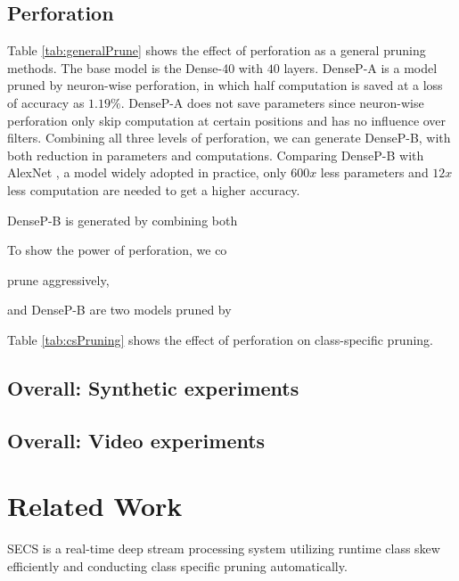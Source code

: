 \documentclass[pageno]{jpaper}
\begin{document}
\subsection{Perforation}
Table \ref{tab:generalPrune} shows the effect of perforation as a general pruning methods. The base model is the Dense-40 \cite{huang2017densely} with $40$ layers. DenseP-A is a model pruned by neuron-wise perforation, in which half computation is saved at a loss of accuracy as $1.19\%$. DenseP-A does not save parameters since neuron-wise perforation only skip computation at certain positions and has no influence over filters. Combining all three levels of perforation, we can generate DenseP-B, with both reduction in parameters and computations. Comparing DenseP-B with AlexNet \cite{NIPS2012_4824}, a model widely adopted in practice, only $600x$ less parameters and $12x$ less computation are needed to get a higher accuracy.


DenseP-B is generated by combining both 


To show the power of perforation, we co 

prune aggressively,  


and DenseP-B are two models pruned by 

Table \ref{tab:csPruning} shows the effect of perforation on class-specific pruning.

\subsection{Overall: Synthetic experiments}


\subsection{Overall: Video experiments}


\newpage
\clearpage
\section{Related Work} \label{relatedWork}
SECS is a real-time deep stream processing system utilizing runtime class skew efficiently and conducting class specific pruning automatically.
\end{document}
